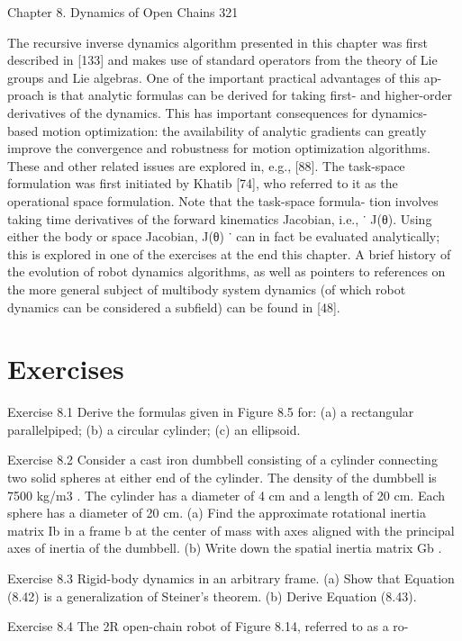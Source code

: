 \documentclass[12pt,a4paper]{article}
\begin{document}
Chapter 8. Dynamics of Open Chains                                                                  321

    The recursive inverse dynamics algorithm presented in this chapter was first
described in [133] and makes use of standard operators from the theory of Lie
groups and Lie algebras. One of the important practical advantages of this ap-
proach is that analytic formulas can be derived for taking first- and higher-order
derivatives of the dynamics. This has important consequences for dynamics-
based motion optimization: the availability of analytic gradients can greatly
improve the convergence and robustness for motion optimization algorithms.
These and other related issues are explored in, e.g., [88].
    The task-space formulation was first initiated by Khatib [74], who referred
to it as the operational space formulation. Note that the task-space formula-
tion involves taking time derivatives of the forward kinematics Jacobian, i.e.,
 ˙
J(θ).  Using either the body or space Jacobian, J(θ) ˙    can in fact be evaluated
analytically; this is explored in one of the exercises at the end this chapter.
    A brief history of the evolution of robot dynamics algorithms, as well as
pointers to references on the more general subject of multibody system dynamics
(of which robot dynamics can be considered a subfield) can be found in [48].

\section{Exercises}

Exercise 8.1 Derive the formulas given in Figure 8.5 for:
 (a) a rectangular parallelpiped;
 (b) a circular cylinder;
 (c) an ellipsoid.

Exercise 8.2 Consider a cast iron dumbbell consisting of a cylinder connecting
two solid spheres at either end of the cylinder. The density of the dumbbell is
7500 kg/m3 . The cylinder has a diameter of 4 cm and a length of 20 cm. Each
sphere has a diameter of 20 cm.
  (a) Find the approximate rotational inertia matrix Ib in a frame {b} at the
      center of mass with axes aligned with the principal axes of inertia of the
      dumbbell.
 (b) Write down the spatial inertia matrix Gb .

Exercise 8.3 Rigid-body dynamics in an arbitrary frame.
 (a) Show that Equation (8.42) is a generalization of Steiner’s theorem.
 (b) Derive Equation (8.43).

Exercise 8.4 The 2R open-chain robot of Figure 8.14, referred to as a ro-
\end{document}

